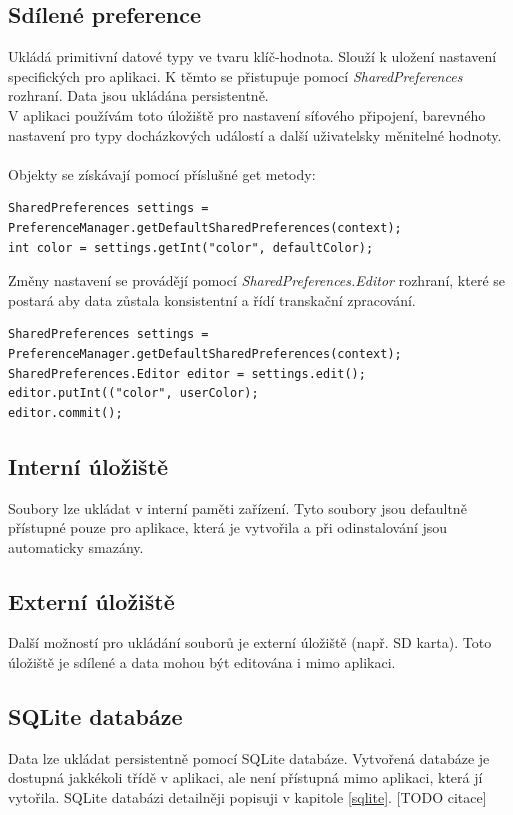 \documentclass{diplomka}
\begin{document}
\subsection*{Sdílené preference} Ukládá primitivní datové typy ve tvaru klíč-hodnota. Slouží k uložení nastavení specifických pro aplikaci. K těmto se přistupuje pomocí \emph{SharedPreferences} rozhraní. Data jsou ukládána persistentně. \\ V aplikaci používám toto úložiště pro nastavení síťového připojení, barevného nastavení pro typy docházkových událostí a další uživatelsky měnitelné hodnoty.\\ \\
Objekty se získávají pomocí příslušné get metody:
\begin{lstlisting}
SharedPreferences settings = PreferenceManager.getDefaultSharedPreferences(context);
int color = settings.getInt("color", defaultColor);
\end{lstlisting}

\noindent
Změny nastavení se provádějí pomocí \emph{SharedPreferences.Editor} rozhraní, které se postará aby data zůstala konsistentní a řídí transkační zpracování.\\
\begin{lstlisting}
SharedPreferences settings = PreferenceManager.getDefaultSharedPreferences(context);
SharedPreferences.Editor editor = settings.edit();
editor.putInt(("color", userColor);
editor.commit();
\end{lstlisting}

\subsection*{Interní úložiště}
Soubory lze ukládat v interní paměti zařízení. Tyto soubory jsou defaultně přístupné pouze pro aplikace, která je vytvořila a při odinstalování jsou automaticky smazány.
\subsection*{Externí úložiště}
Další možností pro ukládání souborů je externí úložiště (např. SD karta).  Toto úložiště je sdílené a data mohou být editována i mimo aplikaci.
\subsection*{SQLite databáze}
Data lze ukládat persistentně pomocí SQLite databáze. Vytvořená databáze je dostupná jakkékoli třídě v aplikaci, ale není přístupná mimo aplikaci, která jí vytořila. SQLite databázi detailněji popisuji v kapitole \ref{sqlite}.
[TODO citace]
\end{document}
